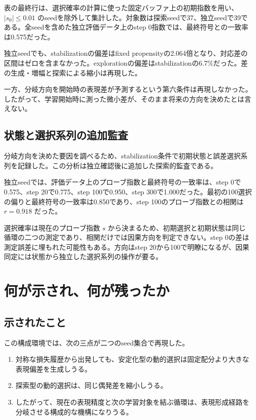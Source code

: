 \documentclass[11pt,a4paper]{ltjsarticle}
\begin{document}
表の最終行は、選択確率の計算に使った固定バッファ上の初期指数を用い、$|s_0|\leq0.01$ のseedを除外して集計した。対象数は探索seedで37、独立seedで39である。全seedを含めた独立評価データ上のstep 0指数では、最終符号との一致率は0.575だった。

独立seedでも、stabilizationの偏差はfixed propensityの2.064倍となり、対応差の区間はゼロを含まなかった。explorationの偏差はstabilizationの6.7\%だった。差の生成・増幅と探索による縮小は再現した。

一方、分岐方向を開始時の表現差が予測するという第六条件は再現しなかった。したがって、学習開始時に測った微小差が、そのまま将来の方向を決めたとは言えない。

\subsection{状態と選択系列の追加監査}

分岐方向を決めた要因を調べるため、stabilization条件で初期状態と誤差選択系列を記録した。この分析は独立確認後に追加した探索的監査である。

独立seedでは、評価データ上のプローブ指数と最終符号の一致率は、step 0で0.575、step 20で0.775、step 100で0.950、step 300で1.000だった。最初の100選択の偏りと最終符号の一致率は0.850であり、step 100のプローブ指数との相関は $r=0.918$ だった。

選択確率は現在のプローブ指数 $s$ から決まるため、初期選択と初期状態は同じ循環の二つの測定であり、相関だけでは因果方向を判定できない。step 0の差は測定誤差に埋もれた可能性もある。方向はstep 20から100で明瞭になるが、因果同定には状態から独立した選択系列の操作が要る。

\section{何が示され、何が残ったか}

\subsection{示されたこと}

この構成環境では、次の三点が二つのseed集合で再現した。

\begin{enumerate}
\item 対称な損失履歴から出発しても、安定化型の動的選択は固定配分より大きな表現偏差を生成しうる。
\item 探索型の動的選択は、同じ偶発差を縮小しうる。
\item したがって、現在の表現精度と次の学習対象を結ぶ循環は、表現形成経路を分岐させる構成的な機構になりうる。
\end{enumerate}
\end{document}
